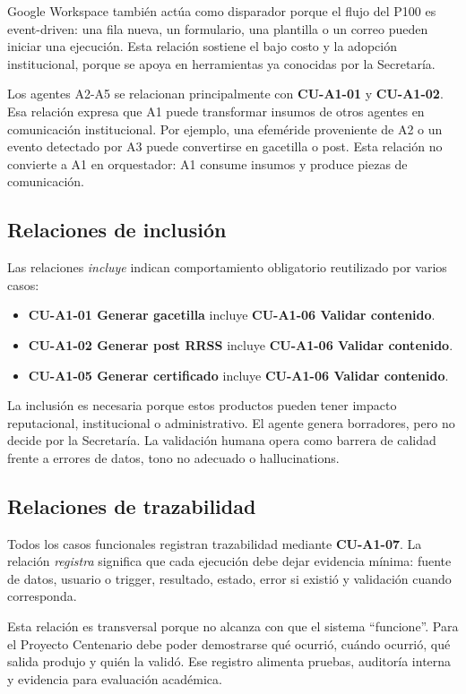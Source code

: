 \documentclass[11pt,a4paper]{article}
\newcommand{\caso}[1]{\textbf{\textcolor{FieBlue}{#1}}}
\begin{document}
Google Workspace también actúa como disparador porque el flujo del P100 es event-driven: una fila nueva, un formulario, una plantilla o un correo pueden iniciar una ejecución. Esta relación sostiene el bajo costo y la adopción institucional, porque se apoya en herramientas ya conocidas por la Secretaría.

Los agentes A2-A5 se relacionan principalmente con \caso{CU-A1-01} y \caso{CU-A1-02}. Esa relación expresa que A1 puede transformar insumos de otros agentes en comunicación institucional. Por ejemplo, una efeméride proveniente de A2 o un evento detectado por A3 puede convertirse en gacetilla o post. Esta relación no convierte a A1 en orquestador: A1 consume insumos y produce piezas de comunicación.

\subsection{Relaciones de inclusión}

Las relaciones \textit{incluye} indican comportamiento obligatorio reutilizado por varios casos:

\begin{itemize}
  \item \caso{CU-A1-01 Generar gacetilla} incluye \caso{CU-A1-06 Validar contenido}.
  \item \caso{CU-A1-02 Generar post RRSS} incluye \caso{CU-A1-06 Validar contenido}.
  \item \caso{CU-A1-05 Generar certificado} incluye \caso{CU-A1-06 Validar contenido}.
\end{itemize}

La inclusión es necesaria porque estos productos pueden tener impacto reputacional, institucional o administrativo. El agente genera borradores, pero no decide por la Secretaría. La validación humana opera como barrera de calidad frente a errores de datos, tono no adecuado o hallucinations.

\subsection{Relaciones de trazabilidad}

Todos los casos funcionales registran trazabilidad mediante \caso{CU-A1-07}. La relación \textit{registra} significa que cada ejecución debe dejar evidencia mínima: fuente de datos, usuario o trigger, resultado, estado, error si existió y validación cuando corresponda.

Esta relación es transversal porque no alcanza con que el sistema ``funcione''. Para el Proyecto Centenario debe poder demostrarse qué ocurrió, cuándo ocurrió, qué salida produjo y quién la validó. Ese registro alimenta pruebas, auditoría interna y evidencia para evaluación académica.
\end{document}
